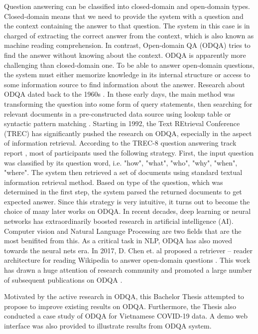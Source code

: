 \documentclass[3p, sort&compress, 12pt]{elsarticle}
\begin{document}
\par Question answering can be classified into closed-domain and open-domain types. Closed-domain means that we need to provide the system with a question and the context containing the answer to that question. The system in this case is in charged of extracting the correct answer from the context, which is also known as machine reading comprehension. In contrast, Open-domain QA (ODQA) tries to find the answer without knowing about the context. ODQA is apparently more challenging than closed-domain one. To be able to answer open-domain questions, the system must either memorize knowledge in its internal structure or access to some information source to find information about the answer. Research about ODQA dated back to the 1960s \cite{green1961baseball}. In these early days, the main method was transforming the question into some form of query statements, then searching for relevant documents in a pre-constructed data source using lookup table \cite{green1961baseball} or syntactic pattern matching \cite{kupiec1993murax}. Starting in 1992, the Text REtrieval Conference (TREC) has significantly pushed the research on ODQA, especially in the aspect of information retrieval. According to the TREC-8 question answering track report \cite{voorhees1999trec}, most of participants used the following strategy. First, the input question was classified by its question word, i.e. "how", "what", "who", "why", "when", "where". The system then retrieved a set of documents using standard textual information retrieval method. Based on type of the question, which was determined in the first step, the system parsed the returned documents to get expected answer. Since this strategy is very intuitive, it turns out to become the choice of many later works on ODQA. In recent decades, deep learning or neural networks has extraordinarily boosted research in artificial intelligence (AI). Computer vision and Natural Language Processing are two fields that are the most benifited from this. As a critical task in NLP, ODQA has also moved towards the neural nets era. In 2017, D. Chen et. al proposed a retriever – reader architecture for reading Wikipedia to answer open-domain questions \cite{chen2017reading}. This work has drawn a huge attention of research community and promoted a large number of subsequent publications on ODQA \cite{wang2017rtheta3,asai2019learning,lee2019latent,min2019discrete,min2019knowledge,seo2019real,wang2019multi,guu2020realm,izacard2020leveraging,karpukhin2020dense,lewis2020retrieval,mao2020generation,min2020ambigqa,roberts2020much,xiong2020progressively,mao2021reader}. 
\par Motivated by the active research in ODQA, this Bachelor Thesis attempted to propose to improve existing results on ODQA. Furthermore, the Thesis also conducted a case study of ODQA for Vietnamese COVID-19 data. A demo web interface was also provided to illustrate results from ODQA system.
\end{document}
